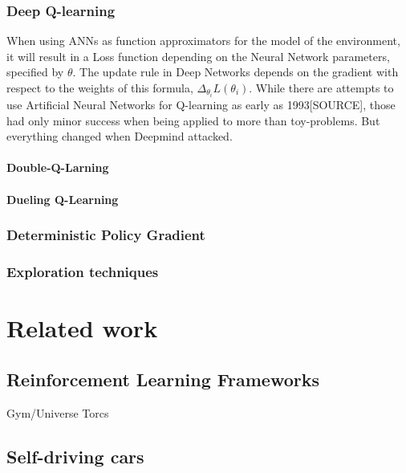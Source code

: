 \subsection{Deep Q-learning}

\noindent When using ANNs as function approximators for the model of the environment, it will result in a Loss function depending on the Neural Network parameters, specified by $\theta$. The update rule in Deep Networks depends on the gradient with respect to the weights of this formula, $\Delta_{\theta_i}L(\theta_i)$.
While there are attempts to use Artificial Neural Networks for Q-learning as early as 1993[SOURCE], those had only minor success when being applied to more than toy-problems. But everything changed when Deepmind attacked.

\subsubsection{Double-Q-Larning}

\subsubsection{Dueling Q-Learning}


\subsection{Deterministic Policy Gradient}

\subsection{Exploration techniques}

\chapter{Related work}

\section{Reinforcement Learning Frameworks}

Gym/Universe
Torcs

\section{Self-driving cars}


